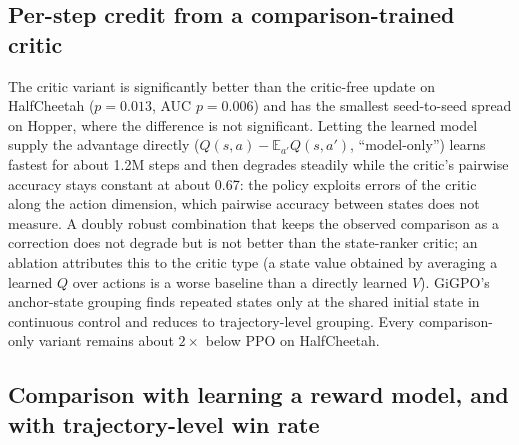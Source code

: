 \documentclass[11pt]{article}
\theoremstyle{remark}
\newcommand{\E}{\mathbb{E}}
\begin{document}
\subsection{Per-step credit from a comparison-trained critic}
\label{sec:exp-critic}
\begin{table}[h]
\centering
\caption{Final return, 3M steps, 10 seeds. PPO and GiGPO use scalar rewards; the remaining four columns use comparisons only. Pre-registered: the critic variant beats the critic-free one on HalfCheetah ($p=0.013$; Hopper not significant); the model-only and doubly robust variants do not beat it.}
\label{tab:critic}
\small
\setlength{\tabcolsep}{4pt}
\end{table}
The critic variant is significantly better than the critic-free update on HalfCheetah ($p=0.013$, AUC $p=0.006$) and has the smallest seed-to-seed spread on Hopper, where the difference is not significant. Letting the learned model supply the advantage directly ($Q(s,a)-\E_{a'}Q(s,a')$, ``model-only'') learns fastest for about 1.2M steps and then degrades steadily while the critic's pairwise accuracy stays constant at about 0.67: the policy exploits errors of the critic along the action dimension, which pairwise accuracy between states does not measure. A doubly robust combination that keeps the observed comparison as a correction does not degrade but is not better than the state-ranker critic; an ablation attributes this to the critic type (a state value obtained by averaging a learned $Q$ over actions is a worse baseline than a directly learned $V$). GiGPO's anchor-state grouping finds repeated states only at the shared initial state in continuous control and reduces to trajectory-level grouping. Every comparison-only variant remains about $2\times$ below PPO on HalfCheetah.

\subsection{Comparison with learning a reward model, and with trajectory-level win rate}
\label{sec:exp-rm}
\begin{table}[h]
\centering
\caption{Final return, 10 seeds. ``Reward model + PPO'' learns $\hat r(s,a)$ from exactly the same comparisons. Pre-registered verdict: comparable; the reward-model route is significantly worse on LunarLander (Holm), where it explains only about 70\% of the comparisons.}
\label{tab:rm}
\end{table}
\end{document}
